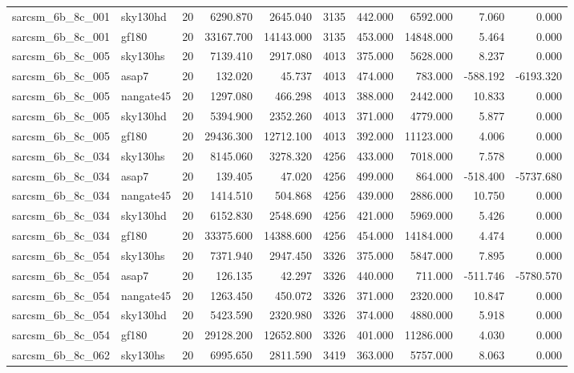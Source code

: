 \begin{tabular}{llrrrrrrrr}
sarcsm\_6b\_8c\_001 & sky130hd & 20 & 6290.870 & 2645.040 & 3135 & 442.000 & 6592.000 & 7.060 & 0.000 \\
sarcsm\_6b\_8c\_001 & gf180 & 20 & 33167.700 & 14143.000 & 3135 & 453.000 & 14848.000 & 5.464 & 0.000 \\
sarcsm\_6b\_8c\_005 & sky130hs & 20 & 7139.410 & 2917.080 & 4013 & 375.000 & 5628.000 & 8.237 & 0.000 \\
sarcsm\_6b\_8c\_005 & asap7 & 20 & 132.020 & 45.737 & 4013 & 474.000 & 783.000 & -588.192 & -6193.320 \\
sarcsm\_6b\_8c\_005 & nangate45 & 20 & 1297.080 & 466.298 & 4013 & 388.000 & 2442.000 & 10.833 & 0.000 \\
sarcsm\_6b\_8c\_005 & sky130hd & 20 & 5394.900 & 2352.260 & 4013 & 371.000 & 4779.000 & 5.877 & 0.000 \\
sarcsm\_6b\_8c\_005 & gf180 & 20 & 29436.300 & 12712.100 & 4013 & 392.000 & 11123.000 & 4.006 & 0.000 \\
sarcsm\_6b\_8c\_034 & sky130hs & 20 & 8145.060 & 3278.320 & 4256 & 433.000 & 7018.000 & 7.578 & 0.000 \\
sarcsm\_6b\_8c\_034 & asap7 & 20 & 139.405 & 47.020 & 4256 & 499.000 & 864.000 & -518.400 & -5737.680 \\
sarcsm\_6b\_8c\_034 & nangate45 & 20 & 1414.510 & 504.868 & 4256 & 439.000 & 2886.000 & 10.750 & 0.000 \\
sarcsm\_6b\_8c\_034 & sky130hd & 20 & 6152.830 & 2548.690 & 4256 & 421.000 & 5969.000 & 5.426 & 0.000 \\
sarcsm\_6b\_8c\_034 & gf180 & 20 & 33375.600 & 14388.600 & 4256 & 454.000 & 14184.000 & 4.474 & 0.000 \\
sarcsm\_6b\_8c\_054 & sky130hs & 20 & 7371.940 & 2947.450 & 3326 & 375.000 & 5847.000 & 7.895 & 0.000 \\
sarcsm\_6b\_8c\_054 & asap7 & 20 & 126.135 & 42.297 & 3326 & 440.000 & 711.000 & -511.746 & -5780.570 \\
sarcsm\_6b\_8c\_054 & nangate45 & 20 & 1263.450 & 450.072 & 3326 & 371.000 & 2320.000 & 10.847 & 0.000 \\
sarcsm\_6b\_8c\_054 & sky130hd & 20 & 5423.590 & 2320.980 & 3326 & 374.000 & 4880.000 & 5.918 & 0.000 \\
sarcsm\_6b\_8c\_054 & gf180 & 20 & 29128.200 & 12652.800 & 3326 & 401.000 & 11286.000 & 4.030 & 0.000 \\
sarcsm\_6b\_8c\_062 & sky130hs & 20 & 6995.650 & 2811.590 & 3419 & 363.000 & 5757.000 & 8.063 & 0.000 \\

\end{tabular}
